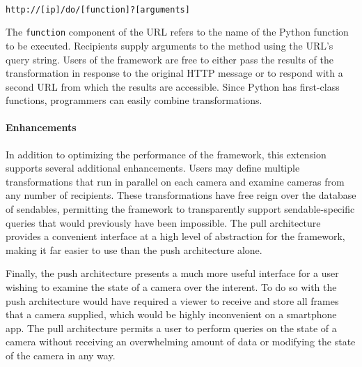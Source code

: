 \texttt{\\http://[ip]/do/[function]?[arguments]\\}

The \texttt{function} component of the URL refers to the name of
the Python function to be executed.  Recipients supply arguments to the method using
the URL's query string.  Users of the framework are free to either
pass the results of the transformation in response to the original HTTP
message or to respond with a second URL from which the results are accessible.
Since Python has first-class functions, programmers can easily 
combine transformations.

\paragraph{Enhancements}

In addition to optimizing the performance of the framework,
this extension supports several additional enhancements.  Users may 
define multiple transformations that run in parallel on each camera and
examine cameras from any number of recipients.  These transformations
have free reign over the database of sendables, permitting
the framework to transparently support sendable-specific queries that
would previously have been impossible.   The pull architecture provides a
convenient interface at a high level of abstraction for the framework, making
it far easier to use than the push architecture alone.

Finally, the push architecture presents a much more useful interface
for a user wishing to examine the state of a camera over the interent.
To do so with the push architecture would have required a viewer to receive
and store all frames that a camera supplied, which would be highly inconvenient on
a smartphone app.  The pull architecture permits a user to perform queries on
the state of a camera without receiving an overwhelming amount of data or
modifying the state of the camera in any way.
